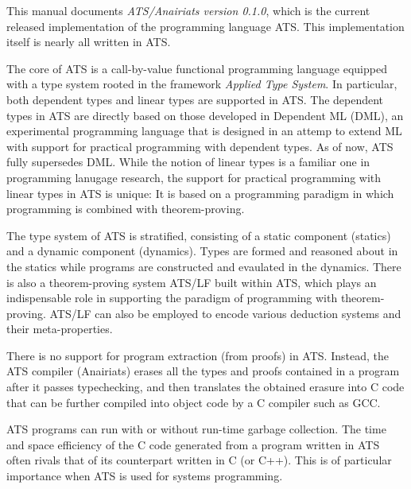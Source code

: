 This manual documents {\em ATS/Anairiats version 0.1.0}, which is the
current released implementation of the programming language ATS. This
implementation itself is nearly all written in ATS.

The core of ATS is a call-by-value functional programming language equipped
with a type system rooted in the framework {\em Applied Type System}. In
particular, both dependent types and linear types are supported in ATS. The
dependent types in ATS are directly based on those developed in Dependent
ML (DML), an experimental programming language that is designed in an
attemp to extend ML with support for practical programming with dependent
types. As of now, ATS fully supersedes DML. While the notion of linear
types is a familiar one in programming lanugage research, the support for
practical programming with linear types in ATS is unique: It is based on a
programming paradigm in which programming is combined with theorem-proving.

The type system of ATS is stratified, consisting of a static component
(statics) and a dynamic component (dynamics). Types are formed and reasoned
about in the statics while programs are constructed and evaulated in the
dynamics. There is also a theorem-proving system ATS/LF built within ATS,
which plays an indispensable role in supporting the paradigm of programming
with theorem-proving. ATS/LF can also be employed to encode various
deduction systems and their meta-properties.

There is no support for program extraction (from proofs) in ATS. Instead,
the ATS compiler (Anairiats) erases all the types and proofs contained in a
program after it passes typechecking, and then translates the obtained
erasure into C code that can be further compiled into object code by a C
compiler such as GCC.

ATS programs can run with or without run-time garbage collection. The time
and space efficiency of the C code generated from a program written in ATS
often rivals that of its counterpart written in C (or C++). This is of
particular importance when ATS is used for systems programming.

